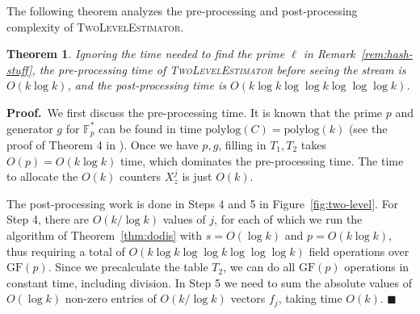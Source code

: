 \documentclass[letterpaper,11pt]{article}
\newcommand{\polylog}{{\mathrm{polylog}}}
\newcommand{\GF}{\mathrm{GF}}
\newcommand{\TheoremName}[1]{\label{thm:#1}}
\newcommand{\Remark}[1]{Remark~\ref{rem:#1}}
\newcommand{\Theorem}[1]{Theorem~\ref{thm:#1}}
\newcommand{\Figure}[1]{Figure~\ref{fig:#1}}
\newtheorem{theorem}{Theorem}\newtheorem{corollary}[theorem]{Corollary}
\newcommand{\proofbelow}{3pt}
\newcommand{\afterproof}{\hfill $\blacksquare$ \par \vspace{\proofbelow}}
\renewenvironment{proof}{\noindent\textbf{Proof.}\,}{\afterproof}
\begin{document}
The following theorem analyzes the pre-processing and post-processing
complexity of \textsc{TwoLevelEstimator}.

\begin{theorem}\TheoremName{tle-preprocess}
Ignoring the time needed to find the prime $\ell$ in \Remark{hash-stuff},
the pre-processing time of \textsc{TwoLevelEstimator} before
seeing the stream is $O(k\log k)$, and the post-processing time is
$O(k\log k\log\log k\log\log\log k)$.
\end{theorem}
\begin{proof}
We first discuss the pre-processing time.  It is known that the prime
$p$ and generator $g$ for $\mathbb{F}_p^*$ can be found in time
$\polylog(C) = \polylog(k)$ (see the proof of Theorem 4 in
\cite{BM84}). Once we have $p,g$, filling in
$T_1,T_2$ takes $O(p) = O(k\log k)$ time, which dominates the
pre-processing time.  The time to allocate the
$O(k)$ counters $X_z^j$ is just $O(k)$.

The post-processing work is done in Steps 4
and 5 in \Figure{two-level}. For Step 4, there are $O(k/\log k)$
values of $j$, for each of which we run the algorithm of
\Theorem{dodis} with $s = O(\log k)$ and $p = O(k\log k)$, thus
requiring a total of $O(k\log k\log\log k\log\log\log k)$ field
operations over $\GF(p)$.  Since we precalculate the table $T_2$, we
can do all $\GF(p)$ operations in constant time, including
division. In
Step 5 we need to sum the absolute values of $O(\log k)$ non-zero
entries of $O(k/\log k)$ vectors $f_j$, taking time $O(k)$.
\end{proof}
\end{document}
